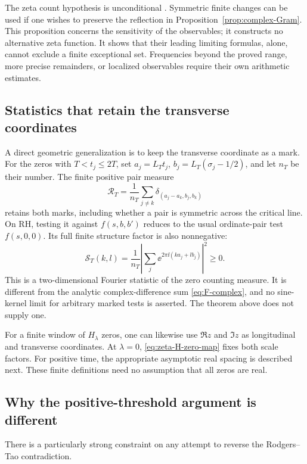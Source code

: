 The zeta count hypothesis is unconditional
\cite[Lemma~2]{BGST2024}. Symmetric finite changes can be used
if one wishes to preserve the reflection in
Proposition~\ref{prop:complex-Gram}. This proposition concerns
the sensitivity of the observables; it constructs no alternative
zeta function. It shows that their leading limiting formulas,
alone, cannot exclude a finite exceptional set. Frequencies
beyond the proved range, more precise remainders, or localized
observables require their own arithmetic estimates.

\subsection{Statistics that retain the transverse coordinates}
A direct geometric generalization is to keep the transverse
coordinate as a mark. For the zeros with \(T<t_j\le2T\), set
\(a_j=L_Tt_j\), \(b_j=L_T(\sigma_j-1/2)\), and let
\(n_T\) be their number. The finite positive pair measure
\begin{equation}\label{eq:marked-pair}
 \mathcal R_T=\frac1{n_T}\sum_{j\ne k}
             \delta_{(a_j-a_k,b_j,b_k)}
\end{equation}
retains both marks, including whether a pair is symmetric across
the critical line. On RH, testing it against \(f(s,b,b')\)
reduces to the usual ordinate-pair test \(f(s,0,0)\).
Its full finite structure factor is also nonnegative:
\begin{equation}\label{eq:marked-structure}
 \mathcal S_T(k,l)=\frac1{n_T}
 \left|\sum_j\ee^{2\pi\ii(ka_j+lb_j)}\right|^2\ge0.
\end{equation}
This is a two-dimensional Fourier statistic of the zero counting
measure. It is different from the analytic complex-difference
sum \eqref{eq:F-complex}, and no sine-kernel limit for arbitrary
marked tests is asserted. The theorem above does not supply one.

For a finite window of \(H_\lambda\) zeros, one can likewise
use \(\Re z\) and \(\Im z\) as longitudinal and transverse
coordinates. At \(\lambda=0\), \eqref{eq:zeta-H-zero-map}
fixes both scale factors. For positive time, the appropriate
asymptotic real spacing is described next. These finite
definitions need no assumption that all zeros are real.

\subsection{Why the positive-threshold argument is different}
There is a particularly strong constraint on any attempt to
reverse the Rodgers--Tao contradiction.

